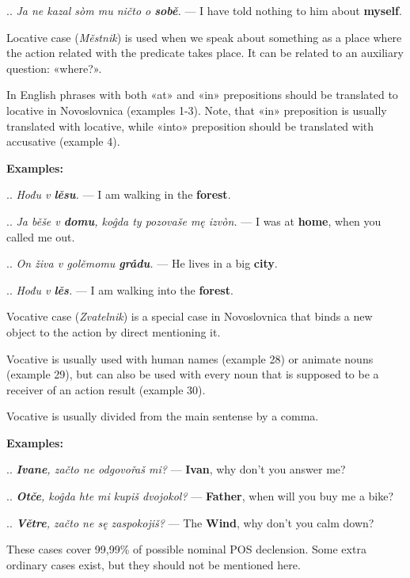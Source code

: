 .. \textit{Ja ne kazal sòm mu ničto o \textbf{sobě}.} — I have told nothing to him about \textbf{myself}.

Locative case (\textit{Městnik}) is used when we speak about something as a place where the action related with the predicate takes place. It can be related to an auxiliary question: «where?».

In English phrases with both «at» and «in» prepositions should be translated to locative in Novoslovnica (examples 1-3). Note, that «in» preposition is usually translated with locative, while «into» preposition should be translated with accusative (example 4).

\textbf{Examples:}

.. \textit{Hođu v \textbf{lěsu}.} — I am walking in the \textbf{forest}.

.. \textit{Ja běše v \textbf{domu}, koĝda ty pozovaše mę izvòn.} — I was at \textbf{home}, when you called me out.

.. \textit{On živa v golěmomu \textbf{grådu}.} — He lives in a big \textbf{city}.

.. \textit{Hođu v \textbf{lěs}.} — I am walking into the \textbf{forest}.

Vocative case (\textit{Zvatelnik}) is a special case in Novoslovnica that binds a new object to the action by direct mentioning it.

Vocative is usually used with human names (example 28) or animate nouns (example 29), but can also be used with every noun that is supposed to be a receiver of an action result (example 30).

Vocative is usually divided from the main sentense by a comma.

\textbf{Examples:}

.. \textit{\textbf{Ivane}, začto ne odgovořaš mi?} — \textbf{Ivan}, why don't you answer me?

.. \textit{\textbf{Otče}, koĝda hte mi kupiš dvojokol?} — \textbf{Father}, when will you buy me a bike?

.. \textit{\textbf{Větre}, začto ne sę zaspokojiš?} — The \textbf{Wind}, why don't you calm down?

These cases cover 99,99\% of possible nominal POS declension. Some extra ordinary cases exist, but they should not be mentioned here.
